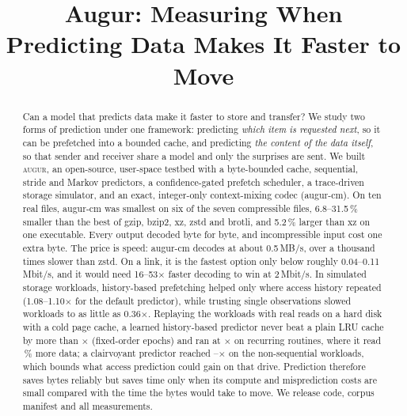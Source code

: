 \documentclass[conference]{IEEEtran}
\newcommand{\augur}{\textsc{augur}}
\newcommand{\cm}{\textsf{augur-cm}}
\begin{document}
\title{Augur: Measuring When Predicting Data Makes It Faster to Move}

\author{
}

\maketitle

\begin{abstract}
Can a model that predicts data make it faster to store and transfer? We study two forms of prediction under one framework: predicting \emph{which item is requested next}, so it can be prefetched into a bounded cache, and predicting \emph{the content of the data itself}, so that sender and receiver share a model and only the surprises are sent. We built \augur, an open-source, user-space testbed with a byte-bounded cache, sequential, stride and Markov predictors, a confidence-gated prefetch scheduler, a trace-driven storage simulator, and an exact, integer-only context-mixing codec (\cm). On ten real files, \cm{} was smallest on six of the seven compressible files, 6.8--31.5\,\% smaller than the best of gzip, bzip2, xz, zstd and brotli, and 5.2\,\% larger than xz on one executable. Every output decoded byte for byte, and incompressible input cost one extra byte. The price is speed: \cm{} decodes at about 0.5\,MB/s, over a thousand times slower than zstd. On a link, it is the fastest option only below roughly 0.04--0.11\,Mbit/s, and it would need 16--53$\times$ faster decoding to win at 2\,Mbit/s. In simulated storage workloads, history-based prefetching helped only where access history repeated (1.08--1.10$\times$ for the default predictor), while trusting single observations slowed workloads to as little as 0.36$\times$. Replaying the workloads with real reads on a hard disk with a cold page cache, a learned history-based predictor never beat a plain LRU cache by more than \realGateFixed$\times$ (fixed-order epochs) and ran at \realMarkovRoutines$\times$ on recurring routines, where it read \realExtraReadPct\,\% more data; a clairvoyant predictor reached \realOracleLo--\realOracleHi$\times$ on the non-sequential workloads, which bounds what access prediction could gain on that drive. Prediction therefore saves bytes reliably but saves time only when its compute and misprediction costs are small compared with the time the bytes would take to move. We release code, corpus manifest and all measurements.
\end{abstract}
\end{document}
